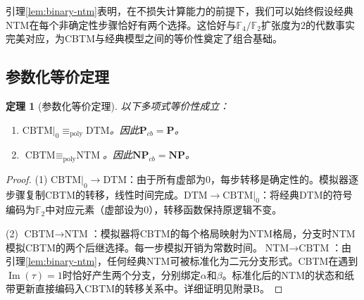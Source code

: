 \documentclass{ctexart}
\newtheorem{theorem}{定理}[section]
\newtheorem{proof}[theorem]{证明}
\begin{document}
	引理\ref{lem:binary-ntm}表明，在不损失计算能力的前提下，我们可以始终假设经典NTM在每个非确定性步骤恰好有两个选择。这恰好与$\mathbb{F}_4/\mathbb{F}_2$扩张度为$2$的代数事实完美对应，为CBTM与经典模型之间的等价性奠定了组合基础。
	
	\subsection{参数化等价定理}
	
	\begin{theorem}[参数化等价定理]\label{thm:equivalence}
		以下多项式等价性成立：
		\begin{enumerate}
			\item $\text{CBTM}|_0 \equiv_{\text{poly}} \text{DTM}$。因此$\mathbf{P}_{cb} = \mathbf{P}$。
			\item $\text{CBTM} \equiv_{\text{poly}} \text{NTM}$。因此$\mathbf{NP}_{cb} = \mathbf{NP}$。
		\end{enumerate}
	\end{theorem}
	\begin{proof}
		(1) $\text{CBTM}|_0 \to \text{DTM}$：由于所有虚部为$0$，每步转移是确定性的。模拟器逐步骤复制CBTM的转移，线性时间完成。$\text{DTM} \to \text{CBTM}|_0$：将经典DTM的符号编码为$\mathbb{F}_2$中对应元素（虚部设为$0$），转移函数保持原逻辑不变。
		
		(2) $\text{CBTM} \to \text{NTM}$：模拟器将CBTM的每个格局映射为NTM格局，分支时NTM模拟CBTM的两个后继选择。每一步模拟开销为常数时间。$\text{NTM} \to \text{CBTM}$：由引理\ref{lem:binary-ntm}，任何经典NTM可被标准化为二元分支形式。CBTM在遇到$\operatorname{Im}(\tau)=1$时恰好产生两个分支，分别绑定$\alpha$和$\beta$。标准化后的NTM的状态和纸带更新直接编码入CBTM的转移关系中。详细证明见附录B。
	\end{proof}
	
\end{document}
